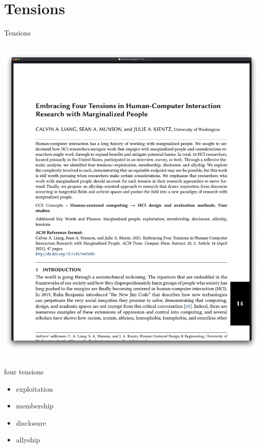 \documentclass[aspectratio=43,17pt]{beamer} %
\begin{document}
\section{Tensions}

\begin{frame}{Tensions}

\begin{columns}
\begin{column}{0.7\textwidth}
\includegraphics[width=\textwidth]{figures/papers/tensions.png}
\end{column}

\end{columns}

\end{frame}

\begin{frame}{four tensions}
    
{\large\scshape\begin{itemize}
\item exploitation
\item membership
\item disclosure
\item allyship
\end{itemize}}

\end{frame}
\end{document}
